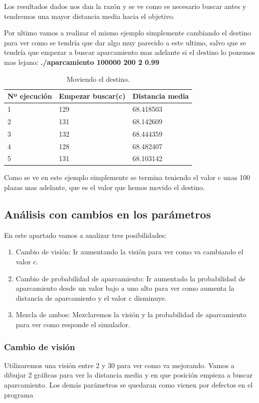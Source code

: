 \documentclass[]{article}
\begin{document}
Los resultados dados nos dan la razón y se ve como es necesario buscar antes y tendremos una mayor distancia media hacia el objetivo.

Por ultimo vamos a realizar el mismo ejemplo simplemente cambiando el destino para ver como se tendría que dar algo muy parecido a este ultimo, salvo que se tendría que empezar a buscar aparcamiento mas adelante si el destino lo ponemos mas lejano: 
\textbf{./aparcamiento 100000 200 2 0.99}
 \begin{table}[htbp]
	\begin{center}
		\begin{tabular}{|l|l|l|}
			\hline
			Nº ejecución & Empezar buscar(c) & Distancia media \\
			\hline \hline
			1 & 129&68.418503
			\\ \hline
			2 & 131&68.142609
			\\ \hline
			3 & 132&68.444359
			\\ \hline
			4 & 128&68.482407
			\\ \hline
			5 & 131&68.103142
			\\ \hline
		\end{tabular}
		\caption{Moviendo el destino.}
		\label{tabla:sencilla}
	\end{center}
\end{table}

Como se ve en este ejemplo simplemente se termina teniendo el valor c unas 100 plazas mas adelante, que es el valor que hemos movido el destino. 

\subsection{Análisis con cambios en los parámetros}
En este apartado vamos a analizar tres posibilidades:
\begin{enumerate}
	\item Cambio de visión: Ir aumentando la visión para ver como va cambiando el valor c.
	\item Cambio de probabilidad de aparcamiento: Ir aumentado la probabilidad de aparcamiento desde un valor bajo a uno alto para ver como aumenta la distancia de aparcamiento y el valor c disminuye.
	\item Mezcla de ambos: Mezclaremos la visión y la probabilidad de aparcamiento para ver como responde el simulador.
\end{enumerate}

\subsubsection{Cambio de visión}
Utilizaremos una visión entre 2 y 30 para ver como va mejorando. Vamos a dibujar 2 gráficas para ver la distancia media y en que posición empieza a buscar aparcamiento. Los demás parámetros se quedaran como vienen por defectos en el programa
\end{document}
